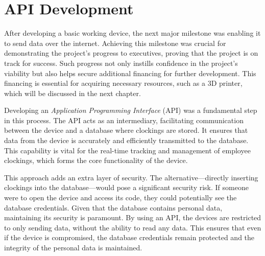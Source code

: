 \chapter{API Development}
\label{cap:apiDevelopment}

After developing a basic working device, the next major milestone was enabling it to send data 
over the internet. Achieving this milestone was crucial for demonstrating the project's 
progress to executives, proving that the project is on track for success. Such progress not only 
instills confidence in the project's viability but also helps secure additional financing for 
further development. This financing is essential for acquiring necessary resources, such as a 3D 
printer, which will be discussed in the next chapter.

Developing an \textit{Application Programming Interface} (API) was a fundamental step in this 
process. The API acts as an intermediary, facilitating communication between the device and a 
database where clockings are stored. It ensures that data from the device is accurately and 
efficiently transmitted to the database. This capability is vital for the real-time tracking and 
management of employee clockings, which forms the core functionality of the device.

This approach adds an extra layer of security. The alternative—directly inserting clockings into 
the database—would pose a significant security risk. If someone were to open the device and access 
its code, they could potentially see the database credentials. Given that the database contains 
personal data, maintaining its security is paramount. By using an API, the devices are restricted 
to only sending data, without the ability to read any data. This ensures that even if the device 
is compromised, the database credentials remain protected and the integrity of the personal data 
is maintained.